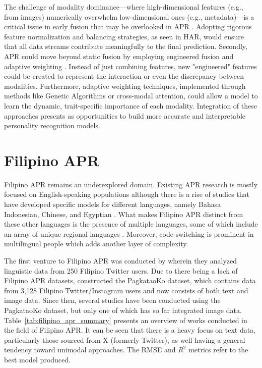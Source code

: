 The challenge of modality dominance—where high-dimensional features (e.g., from images) numerically overwhelm low-dimensional ones (e.g., metadata)—is a critical issue in early fusion that may be overlooked in APR \citep{Ehatisham-Ul-Haq_Javed_Azam_Malik_Irtaza_Lee_Mahmood_2019}. Adopting rigorous feature normalization and balancing strategies, as seen in HAR, would ensure that all data streams contribute meaningfully to the final prediction. Secondly, APR could move beyond static fusion by employing engineered fusion and adaptive weighting \citep{Cai_Qu_Li_Zhang_Hu_Hu_2020}. Instead of just combining features, new "engineered" features could be created to represent the interaction or even the discrepancy between modalities. Furthermore, adaptive weighting techniques, implemented through methods like Genetic Algorithms or cross-modal attention, could allow a model to learn the dynamic, trait-specific importance of each modality. Integration of these approaches presents as opportunities to build more accurate and interpretable personality recognition models.

\section{Filipino APR}
\label{sec: FilipinoAPR}
Filipino APR remains an underexplored domain. Existing APR research is mostly focused on English-speaking populations although there is a rise of studies that have developed specific models for different languages, namely Bahasa Indonesian, Chinese, and Egyptian \citep{Siddique2019, Salem2019, Adi2018}. What makes Filipino APR distinct from these other languages is the presence of multiple languages, some of which include an array of unique regional languages \citep{tighe_modeling_2018}. Moreover, code-switching is prominent in multilingual people which adds another layer of complexity.

The first venture to Filipino APR was conducted by \citet{tighe_modeling_2018} wherein they analyzed linguistic data from 250 Filipino Twitter users. Due to there being a lack of Filipino APR datasets, \citet{tighe_acorda_2022} constructed the PagkataoKo dataset, which contains data from 3,128 Filipino Twitter/Instagram users and now consists of both text and image data. Since then, several studies have been conducted using the PagkataoKo dataset, but only one of which has so far integrated image data. Table~\ref{tab:filipino_apr_summary} presents an overview of works conducted in the field of Filipino APR. It can be seen that there is a heavy focus on text data, particularly those sourced from X (formerly Twitter), as well having a general tendency toward unimodal approaches. The RMSE and $R^2$ metrics refer to the best model produced.

